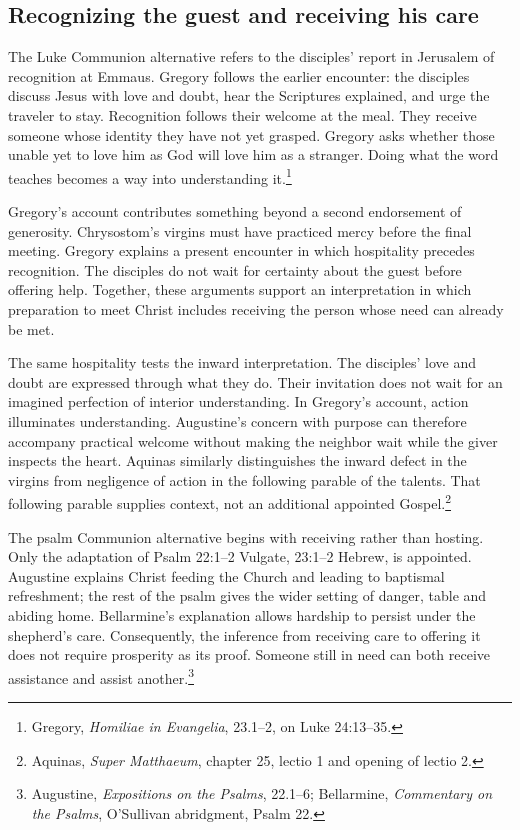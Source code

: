 \subsection{Recognizing the guest and receiving his care}
The Luke Communion alternative refers to the disciples' report in Jerusalem of recognition at Emmaus. Gregory follows the earlier encounter: the disciples discuss Jesus with love and doubt, hear the Scriptures explained, and urge the traveler to stay. Recognition follows their welcome at the meal. They receive someone whose identity they have not yet grasped. Gregory asks whether those unable yet to love him as God will love him as a stranger. Doing what the word teaches becomes a way into understanding it.\footnote{Gregory, \textit{Homiliae in Evangelia}, 23.1--2, on Luke 24:13--35.}

Gregory's account contributes something beyond a second endorsement of generosity. Chrysostom's virgins must have practiced mercy before the final meeting. Gregory explains a present encounter in which hospitality precedes recognition. The disciples do not wait for certainty about the guest before offering help. Together, these arguments support an interpretation in which preparation to meet Christ includes receiving the person whose need can already be met.

The same hospitality tests the inward interpretation. The disciples' love and doubt are expressed through what they do. Their invitation does not wait for an imagined perfection of interior understanding. In Gregory's account, action illuminates understanding. Augustine's concern with purpose can therefore accompany practical welcome without making the neighbor wait while the giver inspects the heart. Aquinas similarly distinguishes the inward defect in the virgins from negligence of action in the following parable of the talents. That following parable supplies context, not an additional appointed Gospel.\footnote{Aquinas, \textit{Super Matthaeum}, chapter 25, lectio 1 and opening of lectio 2.}

The psalm Communion alternative begins with receiving rather than hosting. Only the adaptation of Psalm 22:1--2 Vulgate, 23:1--2 Hebrew, is appointed. Augustine explains Christ feeding the Church and leading to baptismal refreshment; the rest of the psalm gives the wider setting of danger, table and abiding home. Bellarmine's explanation allows hardship to persist under the shepherd's care. Consequently, the inference from receiving care to offering it does not require prosperity as its proof. Someone still in need can both receive assistance and assist another.\footnote{Augustine, \textit{Expositions on the Psalms}, 22.1--6; Bellarmine, \textit{Commentary on the Psalms}, O'Sullivan abridgment, Psalm 22.}

